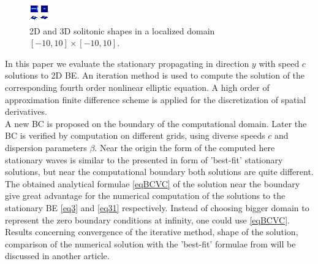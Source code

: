 \documentclass[12pt]{article}
\theoremstyle{theorem}
\theoremstyle{defi}
\begin{document}
\begin{figure}[htbp]
        \centering
              \includegraphics[width=0.98\linewidth]{figure2.eps}   
        \caption{ 2D and 3D solitonic shapes in a localized domain  $[-10, 10] \times [-10, 10]$.}
	\label{fig2}
\end{figure}

	In this paper we evaluate the stationary propagating in direction $y$ with speed $c$ solutions to 2D BE. An iteration method is used to compute the solution of the corresponding fourth order nonlinear  elliptic equation. A high order of approximation finite difference scheme is applied for the discretization of spatial derivatives.
\\
A new BC is proposed on the boundary of the computational domain. Later the BC is verified by computation on different grids, using diverse speeds $c$ and dispersion parameters $\beta$. Near the origin the form of the computed here stationary waves is similar to the presented in \cite{ref10} form of 'best-fit' stationary solutions, but near the computational boundary both solutions are quite different.
\\
The obtained analytical formulae \eqref{eqBCVC} of the solution near the boundary give great advantage for the numerical computation of the solutions to the stationary BE \eqref{eq3} and \eqref{eq31} respectively. Instead of choosing bigger domain to represent the zero boundary conditions at infinity, one could use \eqref{eqBCVC}.
\\
Results concerning convergence of the iterative method, shape of the solution, comparison of the numerical solution with the 'best-fit' formulae from \cite{ref10} will be discussed in another article.
\end{document}
